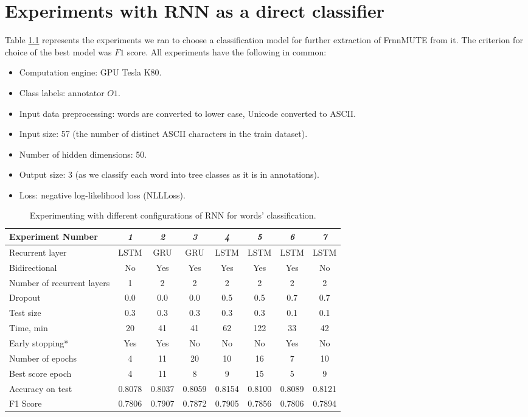 \chapter{Experiments with RNN as a direct classifier}
\label{appx:rnn}
Table \ref{tab:rnn-experiments} represents the experiments we ran to choose a classification model for further extraction of FrnnMUTE from it. The criterion for choice of the best model was $F1$ score. All experiments have the following in common:
\begin{itemize}
    \item Computation engine: GPU Tesla K80.
    \item Class labels: annotator $O1$.
    \item Input data preprocessing: words are converted to lower case, Unicode converted to ASCII.
    \item Input size: 57 (the number of distinct ASCII characters in the train dataset).
    \item Number of hidden dimensions: 50.
    \item Output size: 3 (as we classify each word into tree classes as it is in annotations).
    \item Loss: negative log-likelihood loss (NLLLoss).
\end{itemize}

\begin{table}[h]
\begin{tabular}{l|ccccccc}
\hline
Experiment Number & \textit{1} & \textit{2} & \textit{3} & \textit{4} & \textit{5} & \textit{6} & \textit{7} \\ \hline
Recurrent layer & LSTM & GRU & GRU & LSTM & LSTM & LSTM & LSTM \\
Bidirectional & No & Yes & Yes & Yes & Yes & Yes & No \\
Number of recurrent layers & 1 & 2 & 2 & 2 & 2 & 2 & 2 \\
Dropout & 0.0 & 0.0 & 0.0 & 0.5 & 0.5 & 0.7 & 0.7 \\
Test size & 0.3 & 0.3 & 0.3 & 0.3 & 0.3 & 0.1 & 0.1 \\
Time, min & 20 & 41 & 41 & 62 & 122 & 33 & 42 \\
Early stopping* & Yes & Yes & No & No & No & Yes & No \\
Number of epochs & 4 & 11 & 20 & 10 & 16 & 7 & 10 \\
Best score epoch & 4 & 11 & 8 & 9 & 15 & 5 & 9 \\
Accuracy on test & 0.8078 & 0.8037 & 0.8059 & 0.8154 & 0.8100 & 0.8089 & 0.8121 \\
F1 Score & 0.7806 & 0.7907 & 0.7872 & 0.7905 & 0.7856 & 0.7806 & 0.7894 \\ \hline
\end{tabular}
  \caption{Experimenting with different configurations of RNN for words' classification.}
  \label{tab:rnn-experiments}
\end{table}

